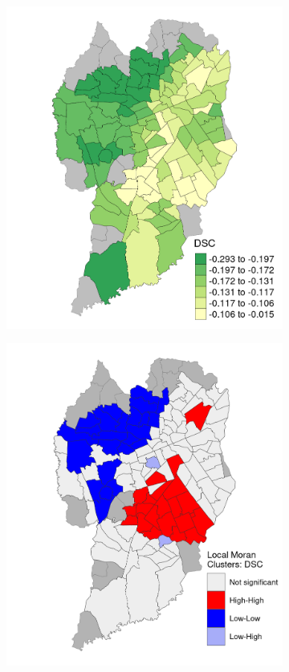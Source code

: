 \begin{figure}[!htbp]
    \centering\footnotesize
    \captionsetup{font=footnotesize}
    \caption{DSC COEFFICIENT ESTIMATES}
    \begin{subfigure}{0.5\textwidth}
        \includegraphics{fig/DSC.png}
    \end{subfigure}%
    \begin{subfigure}{0.5\textwidth}
        \includegraphics{fig/lisa_DSC.png}

\end{subfigure}
\end{figure}
